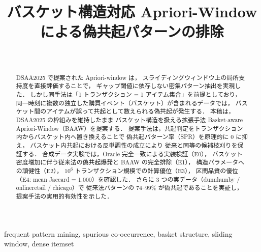 \documentclass[conference]{IEEEtran}
\begin{document}
\title{バスケット構造対応 Apriori-Window による偽共起パターンの排除}

\author{
  \\
}

\maketitle
\pagestyle{plain}

\begin{abstract}
DSAA2025 で提案された Apriori-window は，
スライディングウィンドウ上の局所支持度を直接評価することで，
ギャップ閾値に依存しない密集パターン抽出を実現した．
しかし同手法は「1 トランザクション = 1 アイテム集合」を前提としており，
同一時刻に複数の独立した購買イベント（バスケット）が含まれるデータでは，
バスケット間のアイテムが誤って共起として数えられる偽共起が発生する．
本稿は，DSAA2025 の枠組みを維持したまま
バスケット構造を扱える拡張手法 Basket-aware Apriori-Window（BAAW）を提案する．
提案手法は，共起判定をトランザクション内からバスケット内へ置き換えることで
偽共起パターン率（SPR）を原理的に 0 に抑え，
バスケット内共起における反単調性の成立により
従来と同等の候補枝刈りを保証する．
合成データ実験では，Oracle 完全一致による実装検証（E0），
バスケット密度増加に伴う従来法の偽共起爆発と BAAW の完全排除（E1），
構造パラメータへの頑健性（E2），
$10^6$ トランザクション規模での計算優位（E3），
区間品質の優位（E4: mean Jaccard = 1.000）を確認した．
さらに 3 つの実データ（dunnhumby / onlineretail / chicago）で
従来法パターンの 74--99\% が偽共起であることを実証し，
提案手法の実用的有効性を示した．
\end{abstract}

\begin{IEEEkeywords}
frequent pattern mining, spurious co-occurrence, basket structure,
sliding window, dense itemset
\end{IEEEkeywords}







\appendices




\end{document}
